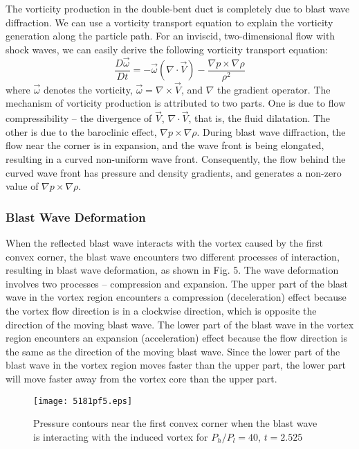 \documentclass[runningheads]{svmult}
\begin{document}
The vorticity production in the double-bent duct is completely due to blast wave diffraction. We can use a vorticity transport equation to explain the vorticity generation along the particle path. For an inviscid, two-dimensional flow with shock waves, we can easily derive the following vorticity transport equation:
$$\frac{D\vec{\omega}}{Dt}=-\vec{\omega}(\nabla\cdot\vec{V})-\frac{\nabla p\times\nabla\rho}{\rho^2}$$ 
where $\vec{\omega}$ denotes the vorticity, $\vec\omega=\nabla\times\vec{V}$, and $\nabla$ the gradient operator. The mechanism of vorticity production is attributed to two parts. One is due to flow compressibility -- the divergence of $\vec{V}$, $\nabla\cdot\vec{V}$, that is, the fluid dilatation. The other is due to the baroclinic effect, $\nabla p\times \nabla \rho$. During  blast wave diffraction, the flow near the corner is in expansion, and the wave front is being elongated, resulting in a curved non-uniform wave front. Consequently, the flow behind the curved wave front has pressure and density gradients, and generates a non-zero value of $\nabla p\times \nabla \rho$.

\subsubsection*{Blast Wave Deformation}

   When the reflected blast wave interacts with the vortex caused by the first convex corner, the blast wave encounters two different processes of interaction, resulting in blast wave deformation, as shown in Fig. 5. The wave deformation involves two processes -- compression and expansion. The upper part of the blast wave in the vortex region encounters a compression (deceleration) effect because the vortex flow direction is in a clockwise direction, which is opposite the direction of the moving blast wave. The lower part of the blast wave in the vortex region encounters an expansion (acceleration) effect because the flow direction is the same as the direction of the moving blast wave. Since the lower part of the blast wave in the vortex region moves faster than the upper part, the lower part will move faster away from the vortex core than the upper part. 
\begin{figure}
\begin{center}
\texttt{[image: 5181pf5.eps]}
\end{center}
\caption{Pressure contours near the first convex corner when the blast wave is interacting with the induced vortex for \(P_h/P_l=40\), $t = 2.525$}
\label{5181plab5}
\end{figure}
\end{document}
